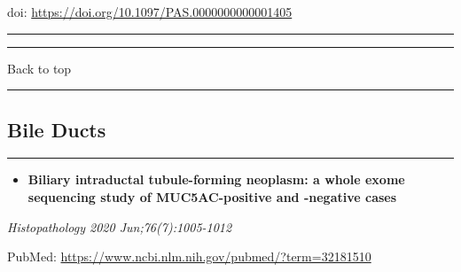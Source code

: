 \documentclass[
]{article}
\providecommand{\tightlist}{%
  \setlength{\itemsep}{0pt}\setlength{\parskip}{0pt}}
\begin{document}
doi: \url{https://doi.org/10.1097/PAS.0000000000001405}

\begin{center}\rule{0.5\linewidth}{0.5pt}\end{center}

\begin{center}\rule{0.5\linewidth}{0.5pt}\end{center}

Back to top

\begin{center}\rule{0.5\linewidth}{0.5pt}\end{center}

\pagebreak

\hypertarget{bileducts}{%
\subsection{Bile Ducts}\label{bileducts}}

\begin{center}\rule{0.5\linewidth}{0.5pt}\end{center}

\begin{itemize}
\tightlist
\item
  \textbf{Biliary intraductal tubule-forming neoplasm: a whole exome
  sequencing study of MUC5AC-positive and -negative cases}
\end{itemize}

\emph{Histopathology 2020 Jun;76(7):1005-1012}

PubMed: \url{https://www.ncbi.nlm.nih.gov/pubmed/?term=32181510}
\end{document}
